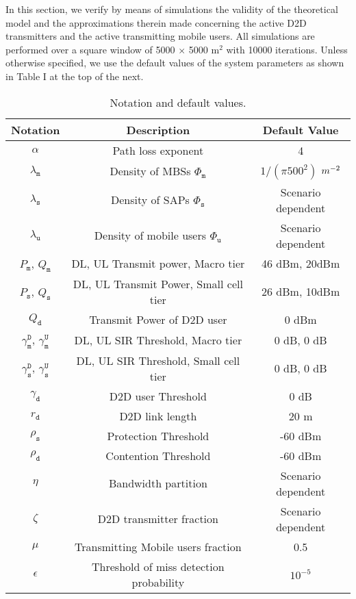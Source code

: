 \documentclass[twocolumn,english]{IEEEtran}
\providecommand{\tabularnewline}{\\}
\theoremstyle{plain}
\theoremstyle{definition}
\begin{document}
In this section, we verify by means of simulations the validity of
the theoretical model and the approximations therein made concerning
the active D2D transmitters and the active transmitting mobile users.
All simulations are performed over a square window of 5000 $\times$
5000 $\textrm{m}^{\textrm{2}}$ with 10000 iterations. Unless otherwise
specified, we use the default values of the system parameters as shown
in Table I at the top of the next.
\begin{table*}[t]
{\Large{}\protect\caption{\label{tab:Notation-and-default}Notation and default values.}
}{\Large \par}

\centering \begin{tabular}{|c|c|c|}
\hline
{\small{}Notation} & {\small{}Description} & {\small{}Default Value}\tabularnewline
\hline
\hline
$\alpha$ & {\small{}Path loss exponent} & {\small{}4}\tabularnewline
\hline
$\lambda_{\mathtt{m}}$ & {\small{}Density of MBSs $\Phi_{\mathtt{m}}$} & {\small{}$1/(\pi500^{2})$ $\textrm{\ensuremath{m^{-2}}}$}\tabularnewline
\hline
$\lambda_{\mathtt{s}}$ & {\small{}Density of SAPs $\Phi_{\mathtt{s}}$ } & {\small{}Scenario dependent}\tabularnewline
\hline
$\lambda_{\mathtt{u}}$ & {\small{}Density of mobile users $\Phi_{\mathtt{u}}$} & {\small{}Scenario dependent}\tabularnewline
\hline
$P_{\mathtt{m}}$, $Q_{\mathtt{m}}$ & {\small{} DL, UL Transmit power, Macro tier} & {\small{}46 dBm, 20dBm}\tabularnewline
\hline
$P_{\mathtt{s}}$, $Q_{\mathtt{s}}$ & {\small{}DL, UL Transmit Power, Small cell tier} & {\small{}26 dBm, 10dBm}\tabularnewline
\hline
$Q_{\mathtt{d}}$  & {\small{}Transmit Power of D2D user} & {\small{}0 dBm}\tabularnewline
\hline
$\gamma_{\mathtt{m}}^{\mathtt{D}}$, $\gamma_{\mathtt{m}}^{\mathtt{U}}$ & {\small{}DL, UL SIR Threshold, Macro tier} & {\small{}0 dB, 0 dB}\tabularnewline
\hline
$\gamma_{\mathtt{s}}^{\mathtt{D}}$, $\gamma_{\mathtt{s}}^{\mathtt{U}}$ & {\small{}DL, UL SIR Threshold, Small cell tier} & {\small{}0 dB, 0 dB}\tabularnewline
\hline
$\gamma_{\mathtt{d}}$ & {\small{}D2D user Threshold} & {\small{}0 dB}\tabularnewline
\hline
$r_{\mathtt{d}}$ & {\small{}D2D link length} & {\small{}20 $\textrm{m}$}\tabularnewline
\hline
$\rho_{\mathtt{s}}$ & {\small{}Protection Threshold } & {\small{}-60 dBm}\tabularnewline
\hline
$\rho_{\mathtt{d}}$ & {\small{}Contention Threshold} & {\small{}-60 dBm}\tabularnewline
\hline
$\eta$ & {\small{}Bandwidth partition } & {\small{}Scenario dependent}\tabularnewline
\hline
$\zeta$  & {\small{}D2D transmitter fraction } & {\small{}Scenario dependent}\tabularnewline
\hline
$\mu$ & {\small{}Transmitting Mobile users fraction } & {\small{}0.5}\tabularnewline
\hline
$\epsilon$ & {\small{}Threshold of miss detection probability} & {\small{}$10^{-5}$}\tabularnewline
\hline
\end{tabular}
\end{table*}
\end{document}
